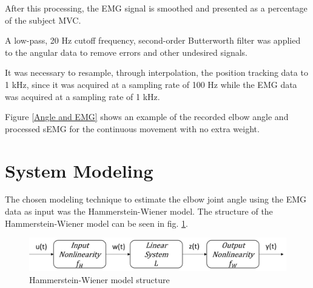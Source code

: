 \documentclass[letterpaper, 10 pt, conference]{ieeeconf}  %
\begin{document}
After this processing, the EMG signal is smoothed and presented as a percentage of the subject MVC.

A low-pass, 20 Hz cutoff frequency, second-order Butterworth filter was applied to the angular data to remove errors and other undesired signals.

It was necessary to resample, through interpolation, the position tracking data to 1 kHz, since it was acquired at a sampling rate of 100 Hz while the EMG data was acquired at a sampling rate of 1 kHz. 

Figure \ref{Angle and EMG} shows an example of the recorded elbow angle and processed sEMG for the continuous movement with no extra weight.




\section{System Modeling}

The chosen modeling technique to estimate the elbow joint angle using the EMG data as input was the Hammerstein-Wiener model. The structure of the Hammerstein-Wiener model can be seen in fig. \ref{HWmodel}. 

\begin{figure}[h]
      \centering
      \includegraphics[width=0.98\columnwidth]{Images/HWmodel.jpg}
      \caption{Hammerstein-Wiener model structure}
      \label{HWmodel}
   \end{figure}
\end{document}
